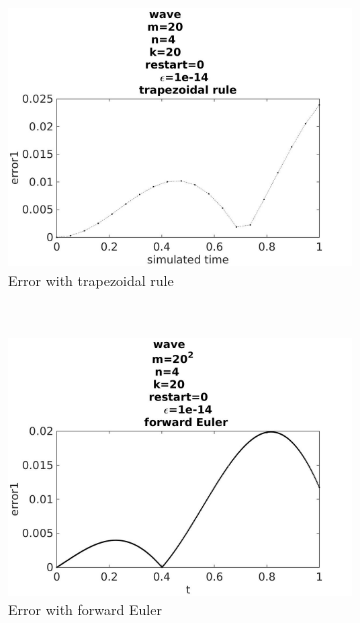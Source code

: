 \begin{figure}[H]
        \begin{subfigure}[b]{0.30\textwidth}
                \includegraphics[width=\textwidth]{../MATLAB/fig/errorovertimetrapezoidal.jpg}
                \caption{ Error with trapezoidal rule }
                \label{fig:errorovertimetrapezoidal}
        \end{subfigure}%
        ~
        \begin{subfigure}[b]{0.30\textwidth}
                \includegraphics[width=\textwidth]{../MATLAB/fig/errorovertimeeuler.jpg}
                \caption{ Error with forward Euler }
                \label{fig:errorovertimeeuler}
        \end{subfigure}
        \begin{subfigure}[b]{0.30\textwidth}

\end{subfigure}
\end{figure}
